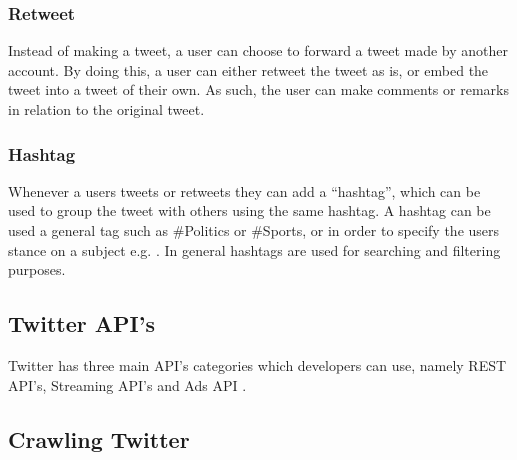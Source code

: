 \subsubsection{Retweet}
Instead of making a tweet, a user can choose to forward a tweet made by another
account. By doing this, a user can either retweet the tweet as is, or embed the
tweet into a tweet of their own. As such, the user can make comments or remarks
in relation to the original tweet.

\subsubsection{Hashtag}
Whenever a users tweets or retweets they can add a ``hashtag'', which can be
used to group the tweet with others using the same hashtag. A hashtag can be
used a general tag such as \#Politics or \#Sports, or in order to specify the
users stance on a subject e.g. .
In general hashtags are used for searching and filtering purposes.

\subsection{Twitter API's}
Twitter has three main API's categories which developers can use, namely REST
API's, Streaming API's and Ads API \citep{TwitterDevDocs}.


\subsection{Crawling Twitter}
